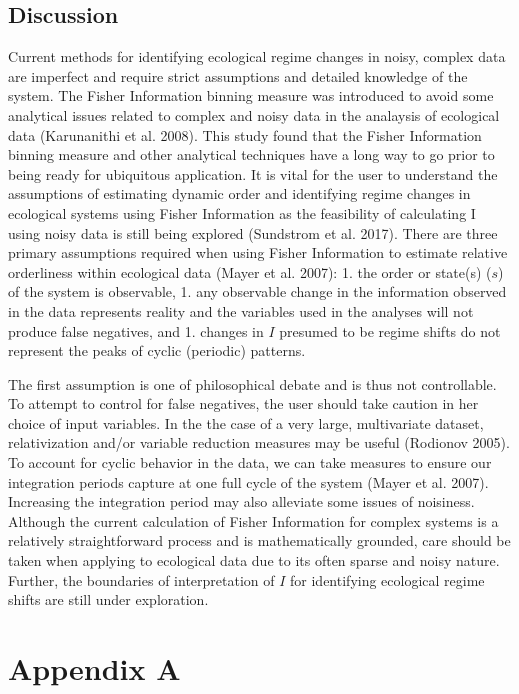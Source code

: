 \documentclass[12pt,twoside]{reedthesis}
\begin{document}
\section{Discussion}\label{discussion-1}

Current methods for identifying ecological regime changes in noisy,
complex data are imperfect and require strict assumptions and detailed
knowledge of the system. The Fisher Information binning measure was
introduced to avoid some analytical issues related to complex and noisy
data in the analaysis of ecological data (Karunanithi et al. 2008). This
study found that the Fisher Information binning measure and other
analytical techniques have a long way to go prior to being ready for
ubiquitous application. It is vital for the user to understand the
assumptions of estimating dynamic order and identifying regime changes
in ecological systems using Fisher Information as the feasibility of
calculating I using noisy data is still being explored (Sundstrom et al.
2017). There are three primary assumptions required when using Fisher
Information to estimate relative orderliness within ecological data
(Mayer et al. 2007): 1. the order or state(s) (\(s\)) of the system is
observable, 1. any observable change in the information observed in the
data represents reality and the variables used in the analyses will not
produce false negatives, and 1. changes in \(I\) presumed to be regime
shifts do not represent the peaks of cyclic (periodic) patterns.

The first assumption is one of philosophical debate and is thus not
controllable. To attempt to control for false negatives, the user should
take caution in her choice of input variables. In the the case of a very
large, multivariate dataset, relativization and/or variable reduction
measures may be useful (Rodionov 2005). To account for cyclic behavior
in the data, we can take measures to ensure our integration periods
capture at one full cycle of the system (Mayer et al. 2007). Increasing
the integration period may also alleviate some issues of noisiness.
Although the current calculation of Fisher Information for complex
systems is a relatively straightforward process and is mathematically
grounded, care should be taken when applying to ecological data due to
its often sparse and noisy nature. Further, the boundaries of
interpretation of \(I\) for identifying ecological regime shifts are
still under exploration.

\appendix

\chapter*{Appendix A}\label{appPaleo}
\end{document}
